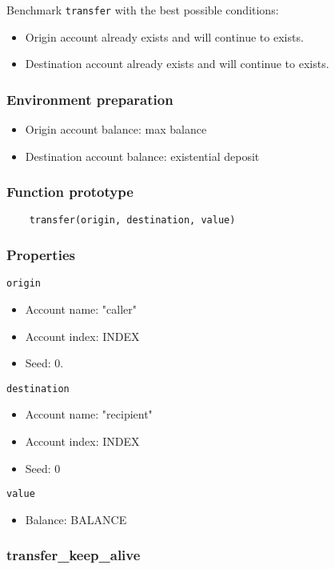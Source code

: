 \documentclass[11pt,a4paper]{article}
\begin{document}
Benchmark \verb|transfer| with the best possible conditions:
\begin{itemize}
\item Origin account already exists and will continue to exists.
\item Destination account already exists and will continue to exists.
\end{itemize}

\subsubsection*{Environment preparation}
\begin{itemize}
\item Origin account balance: max balance
\item Destination account balance: existential deposit
\end{itemize}

\subsubsection*{Function prototype}
\begin{verbatim}
    transfer(origin, destination, value)
\end{verbatim}

\subsubsection*{Properties}
\verb|origin|
\begin{itemize}
\item Account name: "caller"
\item Account index: INDEX
\item Seed: 0.
\end{itemize}
\verb|destination|
\begin{itemize}
\item Account name: "recipient"
\item Account index: INDEX
\item Seed: 0
\end{itemize}
\verb|value|
\begin{itemize}
\item Balance: BALANCE
\end{itemize}

\subsubsection{transfer\_keep\_alive}
\end{document}
